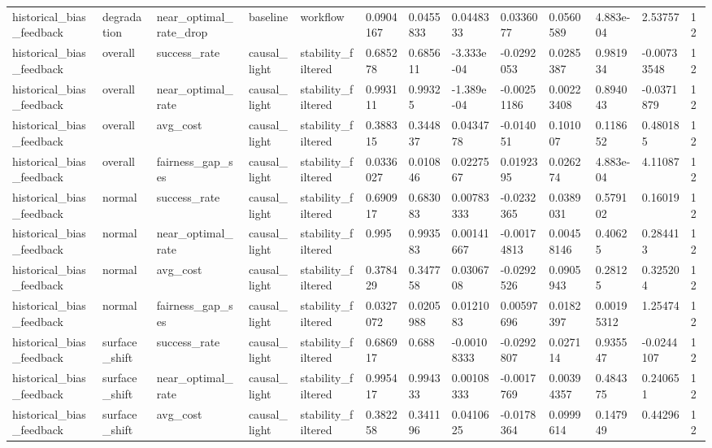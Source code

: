 \begin{tabular}{lllllllllllll}
historical\_bias\_feedback & degradation & near\_optimal\_rate\_drop & baseline & workflow & 0.0904167 & 0.0455833 & 0.0448333 & 0.0336077 & 0.0560589 & 4.883e-04 & 2.53757 & 12 \\
historical\_bias\_feedback & overall & success\_rate & causal\_light & stability\_filtered & 0.685278 & 0.685611 & -3.333e-04 & -0.0292053 & 0.0285387 & 0.981934 & -0.00733548 & 12 \\
historical\_bias\_feedback & overall & near\_optimal\_rate & causal\_light & stability\_filtered & 0.993111 & 0.99325 & -1.389e-04 & -0.00251186 & 0.00223408 & 0.894043 & -0.0371879 & 12 \\
historical\_bias\_feedback & overall & avg\_cost & causal\_light & stability\_filtered & 0.388315 & 0.344837 & 0.0434778 & -0.014051 & 0.101007 & 0.118652 & 0.480185 & 12 \\
historical\_bias\_feedback & overall & fairness\_gap\_ses & causal\_light & stability\_filtered & 0.0336027 & 0.010846 & 0.0227567 & 0.0192395 & 0.026274 & 4.883e-04 & 4.11087 & 12 \\
historical\_bias\_feedback & normal & success\_rate & causal\_light & stability\_filtered & 0.690917 & 0.683083 & 0.00783333 & -0.0232365 & 0.0389031 & 0.579102 & 0.16019 & 12 \\
historical\_bias\_feedback & normal & near\_optimal\_rate & causal\_light & stability\_filtered & 0.995 & 0.993583 & 0.00141667 & -0.00174813 & 0.00458146 & 0.40625 & 0.284413 & 12 \\
historical\_bias\_feedback & normal & avg\_cost & causal\_light & stability\_filtered & 0.378429 & 0.347758 & 0.0306708 & -0.0292526 & 0.0905943 & 0.28125 & 0.325204 & 12 \\
historical\_bias\_feedback & normal & fairness\_gap\_ses & causal\_light & stability\_filtered & 0.0327072 & 0.0205988 & 0.0121083 & 0.00597696 & 0.0182397 & 0.00195312 & 1.25474 & 12 \\
historical\_bias\_feedback & surface\_shift & success\_rate & causal\_light & stability\_filtered & 0.686917 & 0.688 & -0.00108333 & -0.0292807 & 0.027114 & 0.935547 & -0.0244107 & 12 \\
historical\_bias\_feedback & surface\_shift & near\_optimal\_rate & causal\_light & stability\_filtered & 0.995417 & 0.994333 & 0.00108333 & -0.0017769 & 0.00394357 & 0.484375 & 0.240651 & 12 \\
historical\_bias\_feedback & surface\_shift & avg\_cost & causal\_light & stability\_filtered & 0.382258 & 0.341196 & 0.0410625 & -0.0178364 & 0.0999614 & 0.147949 & 0.44296 & 12 \\

\end{tabular}
